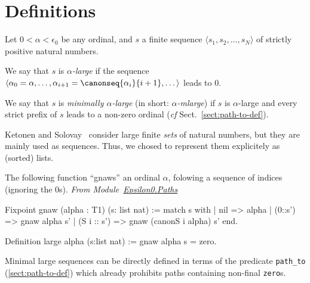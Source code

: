 \section{Definitions}


\begin{definition}
Let $0<\alpha<\epsilon_0$ be any ordinal, and $s$ a finite sequence $\langle s_1, s_2, \dots, s_N\rangle$ of strictly positive natural numbers. 

We say that $s$ is \emph{$\alpha$-large} if the sequence $\langle \alpha_0=\alpha,\dots,\alpha_{i+1}=\canonseq{\alpha_i}{i+1},\dots \rangle$ leads to $0$. 

We say that $s$ is \emph{minimally $\alpha$-large} (in short:
\emph{$\alpha$-mlarge}) if $s$ is $\alpha$-large 
 and every strict prefix of $s$ leads to a non-zero ordinal (\emph{cf} Sect.~\vref{sect:path-to-def}).


\end{definition}



\begin{remark}
  Ketonen and Solovay~\cite{KS81} consider  large finite \emph{sets} of natural numbers,  but they are mainly used as sequences. Thus, we chosed to represent them explicitely as (sorted) lists. 
\end{remark}


The following function ``gnaws'' an ordinal $\alpha$, folowing a sequence of indices (ignoring the $0$s).
\noindent
\emph{From Module~\href{../theories/html/hydras.Epsilon0.Paths.html\#gnaw}{Epsilon0.Paths}}

\begin{Coqsrc}
Fixpoint gnaw (alpha : T1) (s: list nat) :=
  match s with
    | nil => alpha
    | (0::s') => gnaw  alpha s'
    | (S i :: s')  =>  gnaw (canonS i alpha) s'
  end.

Definition large alpha (s:list nat) := gnaw alpha s = zero.
\end{Coqsrc}


Minimal large sequences can be directly defined in terms of the
predicate \texttt{path\_to} (\vref{sect:path-to-def}) which already prohibits paths containing non-final \texttt{zero}s.

